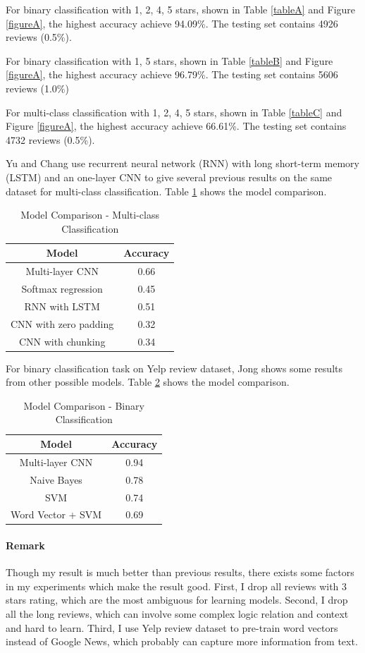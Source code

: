 \documentclass[11pt]{article}
\theoremstyle{definition}
\theoremstyle{basic}
\begin{document}
For binary classification with 1, 2, 4, 5 stars, shown in Table \ref{tableA} and Figure \ref{figureA}, the highest accuracy achieve 94.09\%.
The testing set contains 4926 reviews (0.5\%).

For binary classification with 1, 5 stars, shown in Table \ref{tableB} and Figure \ref{figureA}, the highest accuracy achieve 96.79\%.
The testing set contains 5606 reviews (1.0\%)

For multi-class classification with 1, 2, 4, 5 stars, shown in Table \ref{tableC} and Figure \ref{figureA}, the highest accuracy achieve 66.61\%.
The testing set contains 4732 reviews (0.5\%).

Yu and Chang\cite{Yu} use recurrent neural network (RNN) with long short-term memory (LSTM) and an one-layer CNN to give several previous results on the same dataset for multi-class classification.
Table \ref{tableD} shows the model comparison.

\begin{table}
\centering
\begin{tabular}{c|c}
Model & Accuracy\\\hline
Multi-layer CNN & 0.66\\\hline
Softmax regression & 0.45\\
RNN with LSTM & 0.51\\
CNN with zero padding & 0.32\\
CNN with chunking & 0.34
\end{tabular}
\caption{Model Comparison - Multi-class Classification}
\label{tableD}
\end{table}

For binary classification task on Yelp review dataset, Jong\cite{Jong} shows some results from other possible models.
Table \ref{tableE} shows the model comparison.

\begin{table}
\centering
\begin{tabular}{c|c}
Model & Accuracy\\\hline
Multi-layer CNN & 0.94\\\hline
Naive Bayes & 0.78\\
SVM & 0.74\\
Word Vector + SVM & 0.69
\end{tabular}
\caption{Model Comparison - Binary Classification}
\label{tableE}
\end{table}

\paragraph{Remark}
Though my result is much better than previous results, there exists some factors in my experiments which make the result good.
First, I drop all reviews with 3 stars rating, which are the most ambiguous for learning models.
Second, I drop all the long reviews, which can involve some complex logic relation and context and hard to learn.
Third, I use Yelp review dataset to pre-train word vectors instead of Google News, which probably can capture more information from text.
\end{document}
